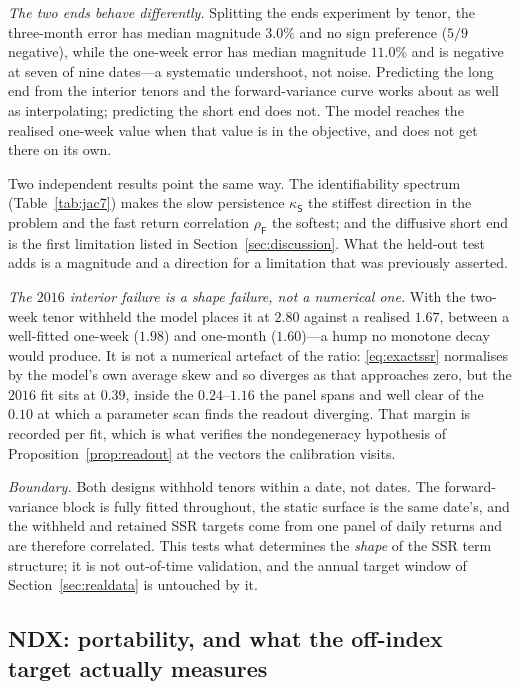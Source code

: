 \documentclass[11pt]{article}
\providecommand{\1}{\mathbf 1}
\begin{document}
\emph{The two ends behave differently.} Splitting the ends experiment by
tenor, the three-month error has median magnitude $3.0\%$ and no sign preference ($5/9$ negative),
while the one-week error has median magnitude $11.0\%$ and is negative at seven of nine dates---a
systematic undershoot, not noise. Predicting the long end from the interior tenors and the
forward-variance curve works about as well as interpolating; predicting the short end does not. The
model reaches the realised one-week value when that value is in the objective, and does not get
there on its own.

Two independent results point the same way. The identifiability spectrum
(Table~\ref{tab:jac7}) makes the slow persistence $\kappa_{\mathsf S}$ the stiffest direction in the
problem and the fast return correlation $\rho_{\mathsf F}$ the softest; and the diffusive short end is the first limitation listed in
Section~\ref{sec:discussion}. What the held-out test adds is a magnitude and a direction for a
limitation that was previously asserted.

\emph{The $2016$ interior failure is a shape failure, not a numerical one.} With the two-week tenor
withheld the model places it at $2.80$ against a realised $1.67$, between a well-fitted one-week
($1.98$) and one-month ($1.60$)---a hump no monotone decay would produce. It is not a numerical
artefact of the ratio: \eqref{eq:exactssr} normalises by the model's own average skew and so
diverges as that approaches zero, but the $2016$ fit sits at $0.39$, inside the $0.24$--$1.16$ the
panel spans and well clear of the $0.10$ at which a parameter scan finds the readout diverging. That
margin is recorded per fit, which is what verifies the nondegeneracy hypothesis of
Proposition~\ref{prop:readout} at the vectors the calibration visits.

\emph{Boundary.} Both designs withhold tenors within a date, not dates. The forward-variance block is
fully fitted throughout, the static surface is the same date's, and the withheld and retained SSR
targets come from one panel of daily returns and are therefore correlated. This tests what determines
the \emph{shape} of the SSR term structure; it is not out-of-time validation, and the annual target
window of Section~\ref{sec:realdata} is untouched by it.

\subsection{NDX: portability, and what the off-index target actually measures}
\label{sec:ndx}
\end{document}
